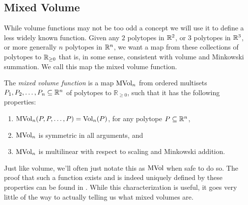 \documentclass[12pt,oneside]{../../sfsuthesis}
\begin{document}
\subsection{Mixed Volume}
While volume functions may not be too odd a concept we will use it to define a less widely known function.
Given any \( 2 \) polytopes in \( \mathbb{R}^2 \), or \( 3 \) polytopes in \( \mathbb{R}^3 \), or more generally \( n \) polytopes in \( \mathbb{R}^n \), we want a map from these collections of polytopes to \( \mathbb{R}_{\geq 0} \) that is, in some sense, consistent with volume and Minkowski summation.
We call this map the mixed volume function.
\begin{definition}\th\label{def:mixedVolume}
    The \emph{mixed volume function} is a map \( \operatorname{MVol}_n \) from ordered multisets \( P_1, P_2, \dots, P_n \subseteq \mathbb{R}^n \) of polytopes to \( \mathbb{R}_{\geq 0} \), such that it has the following properties:
    \begin{enumerate}
        \item \( \operatorname{MVol}_n(P, P, \dots, P) = \operatorname{Vol}_n(P) \), for any polytope \( P \subseteq \mathbb{R}^n \),
        \item \( \operatorname{MVol}_n \) is symmetric in all arguments, and
        \item \( \operatorname{MVol}_n \) is multilinear with respect to scaling and Minkowski addition.
    \end{enumerate}
\end{definition}
Just like volume, we'll often just notate this as \( \operatorname{MVol} \) when safe to do so.
The proof that such a function exists and is indeed uniquely defined by these properties can be found in \cite{schneiderConvexBodiesBrunn2013}.
While this characterization is useful, it goes very little of the way to actually telling us what mixed volumes are.
\end{document}
